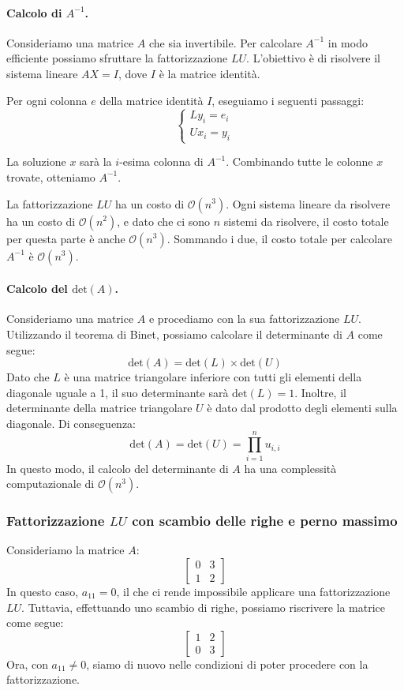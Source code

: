 \documentclass{article}
\begin{document}
\paragraph{Calcolo di $A^{-1}$.} Consideriamo una matrice $A$ che sia
invertibile. Per calcolare $A^{-1}$
in modo efficiente possiamo sfruttare la fattorizzazione $LU$. L'obiettivo è
di risolvere il sistema lineare $AX=I$, dove $I$ è la matrice identità.

Per ogni colonna $e$ della matrice identità $I$, eseguiamo i seguenti
passaggi:
$$\begin{cases}
   Ly_i=e_i \\ 
   Ux_i=y_i
\end{cases}$$

La soluzione $x$ sarà la $i$-esima colonna di $A^{-1}$. Combinando tutte le
colonne $x$ trovate, otteniamo $A^{-1}$.

La fattorizzazione $LU$ ha un costo di $\mathcal{O}(n^3)$. Ogni sistema
lineare da risolvere ha un costo di $\mathcal{O}(n^2)$, e dato che ci sono $n$
sistemi da risolvere, il costo totale per questa parte è anche
$\mathcal{O}(n^3)$. Sommando i due, il costo totale per calcolare $A^{-1}$ è
$\mathcal{O}(n^3)$.
\paragraph{Calcolo del $\text{det}(A)$.}
Consideriamo una matrice $A$ e procediamo con la sua fattorizzazione $LU$.
Utilizzando il teorema di Binet, possiamo calcolare il determinante di $A$
come segue:
$$\text{det}(A)=\text{det}(L)\times \text{det}(U)$$
Dato che $L$ è una matrice triangolare inferiore con tutti gli elementi della
diagonale uguale a 1, il suo determinante sarà $\text{det}(L)=1$. Inoltre, il
determinante della matrice triangolare $U$ è dato dal prodotto degli
elementi sulla diagonale. Di conseguenza:
$$\text{det}(A)=\text{det}(U)=\prod_{i=1}^{n}u_{i,i}$$
In questo modo, il calcolo del determinante di $A$ ha una complessità
computazionale di $\mathcal{O}(n^3)$.
\subsubsection{Fattorizzazione $LU$ con scambio delle righe e perno massimo}
Consideriamo la matrice $A$:
$$\begin{bmatrix}
    0 & 3 \\ 
    1 & 2
\end{bmatrix}$$
In questo caso, $a_{11}=0$, il che ci rende impossibile applicare una fattorizzazione $LU$.
Tuttavia, effettuando uno scambio di righe, possiamo riscrivere la matrice come segue:
$$\begin{bmatrix}
    1 & 2 \\ 
    0 & 3
\end{bmatrix}$$
Ora, con $a_{11}\neq0$, siamo di nuovo nelle condizioni di poter procedere con
la fattorizzazione.
\end{document}

